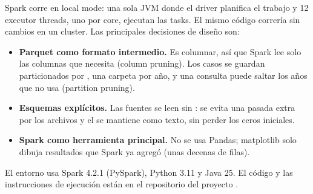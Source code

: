 Spark corre en local mode: una sola JVM donde el driver planifica el trabajo y 12 executor threads, uno por
core, ejecutan las tasks. El mismo código correría sin cambios en un cluster. Las principales decisiones de
diseño son:
\begin{itemize}
  \item \textbf{Parquet como formato intermedio.} Es columnar, así que Spark lee solo las columnas que necesita
        (column pruning). Los casos se guardan particionados por , una carpeta por año, y una consulta
        puede saltar los años que no usa (partition pruning).
  \item \textbf{Esquemas explícitos.} Las fuentes se leen sin : se evita una pasada extra por
        los archivos y el  se mantiene como texto, sin perder los ceros iniciales.
  \item \textbf{Spark como herramienta principal.} No se usa Pandas; matplotlib solo dibuja resultados que Spark
        ya agregó (unas decenas de filas).
\end{itemize}

El entorno usa Spark 4.2.1 (PySpark), Python 3.11 y Java 25. El código y las instrucciones de ejecución están en
el repositorio del proyecto \cite{repo}.
